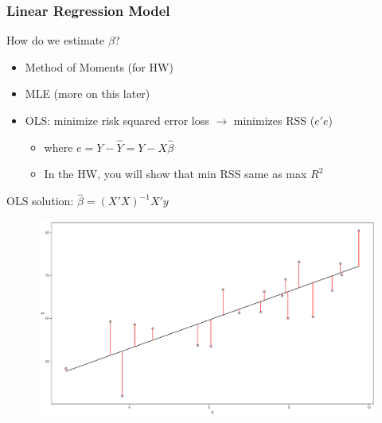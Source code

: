 \documentclass[
  shownotes,
  xcolor={svgnames},
  hyperref={colorlinks,citecolor=DarkBlue,linkcolor=DarkRed,urlcolor=DarkBlue}
  ]{beamer}
\begin{document}
\begin{frame}
\frametitle{Linear Regression Model}

How do we estimate $\beta$?

\begin{itemize}
  \footnotesize
  \item Method of Moments {\tiny (for HW)}
  \item MLE {\tiny (more on this later)}
  \item OLS: minimize risk squared error loss $\rightarrow$ minimizes RSS ($e'e$) 
  \begin{itemize}
    \tiny
  \item where $e=Y-\hat Y=Y-X\hat\beta$
  \item In the HW, you will show that min RSS same as max $R^2$
  \end{itemize}  
\end{itemize}
\bigskip

OLS solution: $\hat \beta = (X'X)^{-1} X'y$

\bigskip
\begin{figure}[H] \centering
  \centering
  \includegraphics[scale=0.22]{figures/fig_1b.pdf}
  \\
  \tiny
\end{figure}


\end{frame}
\end{document}
